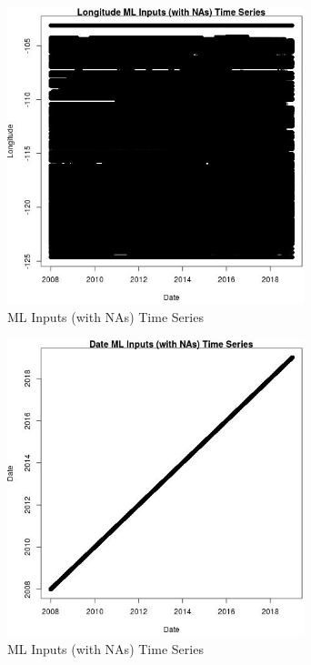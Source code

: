 \begin{figure} 
\centering  
\includegraphics[width=0.77\textwidth]{Code_Outputs/Report_ML_input_PM25_Step4_part_f_de_duplicated_aveswNAs_LongitudevDate.jpg} 
\caption{\label{fig:Report_ML_input_PM25_Step4_part_f_de_duplicated_aveswNAsLongitudevDate}ML Inputs (with NAs) Time Series} 
\end{figure} 
 

\begin{figure} 
\centering  
\includegraphics[width=0.77\textwidth]{Code_Outputs/Report_ML_input_PM25_Step4_part_f_de_duplicated_aveswNAs_DatevDate.jpg} 
\caption{\label{fig:Report_ML_input_PM25_Step4_part_f_de_duplicated_aveswNAsDatevDate}ML Inputs (with NAs) Time Series} 
\end{figure} 
 

